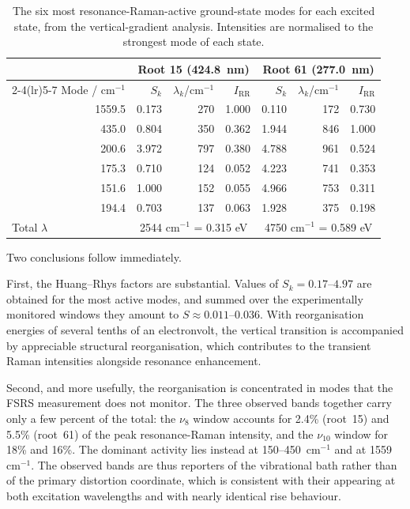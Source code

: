 \documentclass[11pt,a4paper]{article}
\newcommand{\wn}{\ensuremath{\mathrm{cm^{-1}}}}
\begin{document}
\begin{table}[htbp]
\centering
\caption{The six most resonance-Raman-active ground-state modes for each
excited state, from the vertical-gradient analysis. Intensities are
normalised to the strongest mode of each state.}
\label{tab:fc}
\begin{tabular}{r r r r  r r r}
\toprule
& \multicolumn{3}{c}{Root 15 (424.8~nm)} & \multicolumn{3}{c}{Root 61 (277.0~nm)} \\
\cmidrule(lr){2-4}\cmidrule(lr){5-7}
Mode / \wn{} & $S_k$ & $\lambda_k$/\wn{} & $I_{\mathrm{RR}}$
             & $S_k$ & $\lambda_k$/\wn{} & $I_{\mathrm{RR}}$ \\
\midrule
1559.5 & 0.173 & 270 & 1.000 & 0.110 & 172 & 0.730 \\
 435.0 & 0.804 & 350 & 0.362 & 1.944 & 846 & 1.000 \\
 200.6 & 3.972 & 797 & 0.380 & 4.788 & 961 & 0.524 \\
 175.3 & 0.710 & 124 & 0.052 & 4.223 & 741 & 0.353 \\
 151.6 & 1.000 & 152 & 0.055 & 4.966 & 753 & 0.311 \\
 194.4 & 0.703 & 137 & 0.063 & 1.928 & 375 & 0.198 \\
\midrule
\multicolumn{1}{l}{Total $\lambda$} & \multicolumn{3}{c}{2544 \wn{} = 0.315 eV}
                                    & \multicolumn{3}{c}{4750 \wn{} = 0.589 eV} \\
\bottomrule
\end{tabular}
\end{table}

Two conclusions follow immediately.

First, the Huang--Rhys factors are substantial. Values of
$S_k = 0.17$--$4.97$ are obtained for the most active modes, and summed over
the experimentally monitored windows they amount to
$S \approx 0.011$--$0.036$. With reorganisation energies of several tenths of
an electronvolt, the vertical transition is accompanied by appreciable
structural reorganisation, which contributes to the transient Raman intensities
alongside resonance enhancement.

Second, and more usefully, the reorganisation is concentrated in modes that
the FSRS measurement does not monitor. The three observed bands together carry
only a few percent of the total: the $\nu_8$ window accounts for 2.4\%
(root~15) and 5.5\% (root~61) of the peak resonance-Raman intensity, and the
$\nu_{10}$ window for 18\% and 16\%. The dominant activity lies instead at
150--450~\wn{} and at 1559~\wn{}. The observed bands are thus reporters of the
vibrational bath rather than of the primary distortion coordinate, which is
consistent with their appearing at both excitation wavelengths and with
nearly identical rise behaviour.
\end{document}

